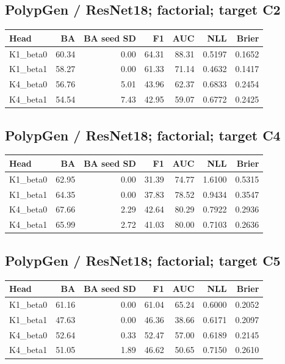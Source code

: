 \subsection*{PolypGen / ResNet18; factorial; target C2}
\begingroup\small\setlength{\tabcolsep}{3pt}
\begin{longtable}{lrrrrrr}
\toprule Head & BA & BA seed SD & F1 & AUC & NLL & Brier \\
\midrule
K1\_beta0 & 60.34 & 0.00 & 64.31 & 88.31 & 0.5197 & 0.1652 \\
K1\_beta1 & 58.27 & 0.00 & 61.33 & 71.14 & 0.4632 & 0.1417 \\
K4\_beta0 & 56.76 & 5.01 & 43.96 & 62.37 & 0.6833 & 0.2454 \\
K4\_beta1 & 54.54 & 7.43 & 42.95 & 59.07 & 0.6772 & 0.2425 \\
\bottomrule
\end{longtable}
\endgroup
\subsection*{PolypGen / ResNet18; factorial; target C4}
\begingroup\small\setlength{\tabcolsep}{3pt}
\begin{longtable}{lrrrrrr}
\toprule Head & BA & BA seed SD & F1 & AUC & NLL & Brier \\
\midrule
K1\_beta0 & 62.95 & 0.00 & 31.39 & 74.77 & 1.6100 & 0.5315 \\
K1\_beta1 & 64.35 & 0.00 & 37.83 & 78.52 & 0.9434 & 0.3547 \\
K4\_beta0 & 67.66 & 2.29 & 42.64 & 80.29 & 0.7922 & 0.2936 \\
K4\_beta1 & 65.99 & 2.72 & 41.03 & 80.00 & 0.7103 & 0.2636 \\
\bottomrule
\end{longtable}
\endgroup
\subsection*{PolypGen / ResNet18; factorial; target C5}
\begingroup\small\setlength{\tabcolsep}{3pt}
\begin{longtable}{lrrrrrr}
\toprule Head & BA & BA seed SD & F1 & AUC & NLL & Brier \\
\midrule
K1\_beta0 & 61.16 & 0.00 & 61.04 & 65.24 & 0.6000 & 0.2052 \\
K1\_beta1 & 47.63 & 0.00 & 46.36 & 38.66 & 0.6171 & 0.2097 \\
K4\_beta0 & 52.64 & 0.33 & 52.47 & 57.00 & 0.6189 & 0.2145 \\
K4\_beta1 & 51.05 & 1.89 & 46.62 & 50.65 & 0.7150 & 0.2610 \\
\bottomrule
\end{longtable}
\endgroup
